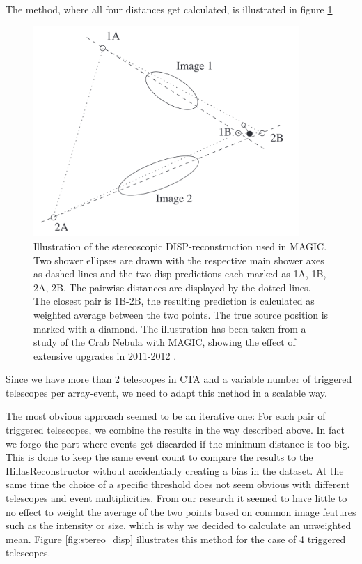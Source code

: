 The method, where all four distances get calculated, is illustrated in figure \ref{fig:disp_magic}

\begin{figure}
    \centering
    \captionsetup{width=0.9\linewidth}
    \includegraphics[width=0.9\textwidth]{images/magic_stereo_disp.png}
    \caption{Illustration of the stereoscopic DISP-reconstruction used in MAGIC.
        Two shower ellipses are drawn with the respective main shower axes as dashed lines
        and the two disp predictions each marked as 1A, 1B, 2A, 2B.
        The pairwise distances are displayed by the dotted lines.
        The closest pair is 1B-2B, the resulting prediction is calculated as 
        weighted average between the two points. The true source position is marked with a diamond.
        The illustration has been taken from a study of the Crab Nebula with MAGIC,
        showing the effect of extensive upgrades in 2011-2012 \cite{ALEKSIC201676}.}
    \label{fig:disp_magic}
\end{figure}

Since we have more than 2 telescopes in CTA and 
a variable number of triggered telescopes per array-event,
we need to adapt this method in a scalable way.

The most obvious approach seemed to be an iterative one:
For each pair of triggered telescopes, we combine the results 
in the way described above. In fact we forgo the part where events get discarded 
if the minimum distance is too big. This is done to keep the same event count to
compare the results to the HillasReconstructor without accidentially creating a bias in the dataset.
At the same time the choice of a specific threshold does not seem obvious
with different telescopes and event multiplicities.
From our research it seemed to have little to no effect to weight
the average of the two points based on common image features such as 
the intensity or size, which is why we decided to calculate an unweighted mean.
Figure \ref{fig:stereo_disp} illustrates this method for the case of 4 triggered telescopes.

